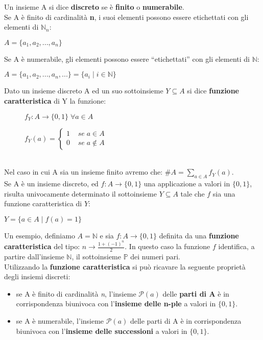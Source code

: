 Un insieme A si dice \textbf{discreto} se è \textbf{finito} o \textbf{numerabile}. \\
Se A è finito di cardinalità \textbf{n}, i suoi elementi possono essere etichettati con gli elementi di $\mathbb{N}_n$:
\begin{center}
    $A = \{a_1, a_2, ..., a_n\}$    
\end{center}
Se A è numerabile, gli elementi possono essere ``etichettati'' con gli elementi di $\mathbb{N}$:
\begin{center}
    $A = \{a_1, a_2, ..., a_n, ...\} = \{a_i \; | \; i \in \mathbb{N} \}$
\end{center}

Dato un insieme discreto A ed un suo sottoinsieme $Y \subseteq A$ si dice \textbf{funzione caratteristica} di Y la funzione:
\begin{figure}[h]
    \begin{minipage}{0.5\textwidth}
        \centering
        $f_Y : A \rightarrow \{0, 1\} \; \forall a \in A$
    \end{minipage}
    \begin{minipage}{0.5\textwidth}
        \centering
        \begin{math}
            f_Y(a) = 
            \begin{cases}
                1 \;\;\;\; se \; a \in A \\
                0 \;\;\;\; se \; a \notin A
            \end{cases}
        \end{math}
    \end{minipage}
\end{figure} \\
Nel caso in cui A sia un insieme finito avremo che: $\#A = \sum_{a \in A}{f_Y(a)}$. \\
Se A è un insieme discreto, ed $f : A \rightarrow \{0, 1\}$ una applicazione a valori in $\{0, 1\}$, risulta univocamente determinato il sottoinsieme $Y \subseteq A$ tale che $f$ sia una funzione caratteristica di $Y$:
\begin{center}
    $Y = \{a \in A \; | \; f(a) = 1\}$
\end{center}
Un esempio, definiamo $A = \mathbb{N}$ e sia $f : A \rightarrow \{0, 1\}$ definita da una \textbf{funzione caratteristica} del tipo: $n \rightarrow \frac{1 + (-1)^{n}}{2}$. In questo caso la funzione $f$ identifica, a partire dall'insieme $\mathbb{N}$, il sottoinsieme $\mathbb{P}$ dei numeri pari. \\
Utilizzando la \textbf{funzione caratteristica} si può ricavare la seguente proprietà degli insiemi discreti:
\begin{itemize}
    \item se A è finito di cardinalità \textit{n}, l'insieme $\mathcal{P}(a)$ delle \textbf{parti di A} è in corrispondenza biunivoca con l'\textbf{insieme delle n-ple} a valori in $\{0, 1\}$.
    \item se A è numerabile, l'insieme $\mathcal{P}(a)$ delle parti di A è in corrispondenza biunivoca con l'\textbf{insieme delle successioni} a valori in $\{0, 1\}$.
\end{itemize}

